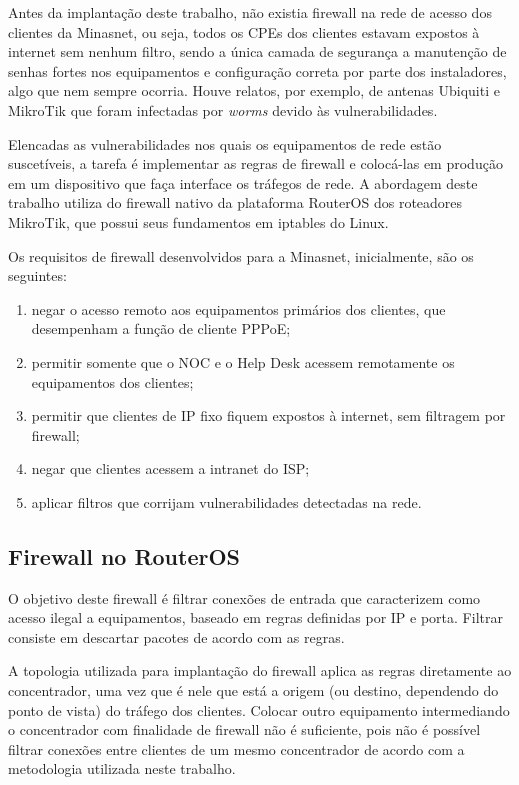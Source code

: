     Antes da implantação deste trabalho, não existia firewall na rede de acesso dos clientes da Minasnet, ou seja, todos os CPEs dos clientes estavam expostos à internet sem nenhum filtro, sendo a única camada de segurança a manutenção de senhas fortes nos equipamentos e configuração correta por parte dos instaladores, algo que nem sempre ocorria. Houve relatos, por exemplo, de antenas Ubiquiti e MikroTik que foram infectadas por \textit{worms} devido às vulnerabilidades.
    
    Elencadas as vulnerabilidades nos quais os equipamentos de rede estão suscetíveis, a tarefa é implementar as regras de firewall e colocá-las em produção em um dispositivo que faça interface os tráfegos de rede. A abordagem deste trabalho utiliza do firewall nativo da plataforma RouterOS dos roteadores MikroTik, que possui seus fundamentos em iptables do Linux.
    
    Os requisitos de firewall desenvolvidos para a Minasnet, inicialmente, são os seguintes: 
    
    \begin{enumerate}[label=\alph*)]
        \item negar o acesso remoto aos equipamentos primários dos clientes, que desempenham a função de cliente PPPoE;
        \item permitir somente que o NOC e o Help Desk acessem remotamente os equipamentos dos clientes;
        \item permitir que clientes de IP fixo fiquem expostos à internet, sem filtragem por firewall;
        \item negar que clientes acessem a intranet do ISP;
        \item aplicar filtros que corrijam vulnerabilidades detectadas na rede.
    \end{enumerate}
    
\subsection{Firewall no RouterOS}

    O objetivo deste firewall é filtrar conexões de entrada que caracterizem como acesso ilegal a equipamentos, baseado em regras definidas por IP e porta. Filtrar consiste em descartar pacotes de acordo com as regras.
    
    A topologia utilizada para implantação do firewall aplica as regras diretamente ao concentrador, uma vez que é nele que está a origem (ou destino, dependendo do ponto de vista) do tráfego dos clientes. Colocar outro equipamento intermediando o concentrador com finalidade de firewall não é suficiente, pois não é possível filtrar conexões entre clientes de um mesmo concentrador de acordo com a metodologia utilizada neste trabalho.
    

